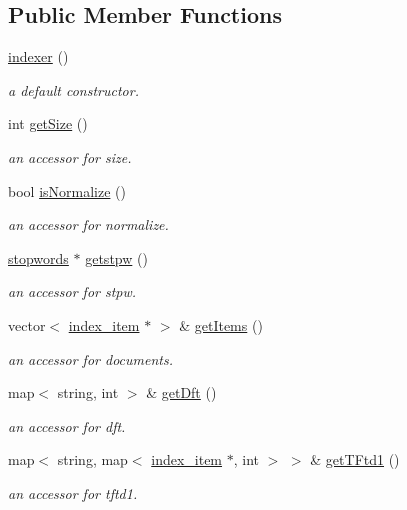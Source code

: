 \subsection*{Public Member Functions}
\begin{DoxyCompactItemize}
\item 
\hyperlink{classindexer_acbbcbad080a7ae43ed78840fcf006960}{indexer} ()
\begin{DoxyCompactList}\small\item\em a default constructor. \end{DoxyCompactList}\item 
int \hyperlink{classindexer_ad9e5eee599f4677d7a6cca2f53aeec44}{get\+Size} ()
\begin{DoxyCompactList}\small\item\em an accessor for size. \end{DoxyCompactList}\item 
bool \hyperlink{classindexer_a48c05d99699e2191d606936b35ecbb0d}{is\+Normalize} ()
\begin{DoxyCompactList}\small\item\em an accessor for normalize. \end{DoxyCompactList}\item 
\hyperlink{classstopwords}{stopwords} $\ast$ \hyperlink{classindexer_a78be8aabef768ba82208956e53316cc5}{getstpw} ()
\begin{DoxyCompactList}\small\item\em an accessor for stpw. \end{DoxyCompactList}\item 
vector$<$ \hyperlink{classindex__item}{index\+\_\+item} $\ast$ $>$ \& \hyperlink{classindexer_ad576259a08d87b8d4486793522a0ca5a}{get\+Items} ()
\begin{DoxyCompactList}\small\item\em an accessor for documents. \end{DoxyCompactList}\item 
map$<$ string, int $>$ \& \hyperlink{classindexer_a99c8633ff92270ecbe76a5c9cf57e2e0}{get\+Dft} ()
\begin{DoxyCompactList}\small\item\em an accessor for dft. \end{DoxyCompactList}\item 
map$<$ string, map$<$ \hyperlink{classindex__item}{index\+\_\+item} $\ast$, int $>$ $>$ \& \hyperlink{classindexer_ad2afffef1c97feb0c7934951ce35319c}{get\+T\+Ftd1} ()
\begin{DoxyCompactList}\small\item\em an accessor for tftd1. \end{DoxyCompactList}\item 

\end{DoxyCompactItemize}
